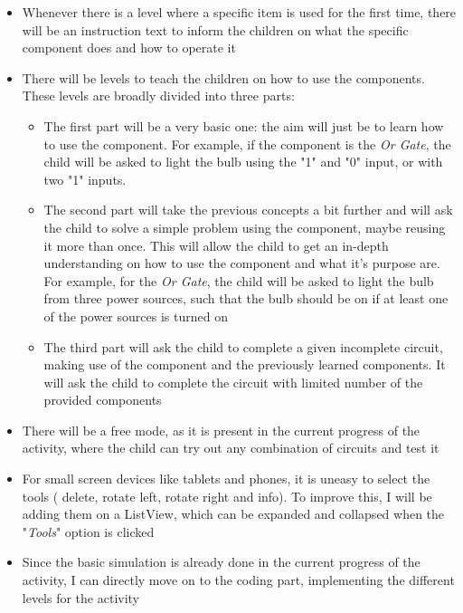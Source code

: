 \documentclass[preprint,12pt]{elsarticle}
\begin{document}
\begin{itemize}
\item Whenever there is a level where a specific item is used for the first time, there will be an instruction text to inform the children on what the specific component does and how to operate it
\item There will be levels to teach the children on how to use the components. These levels are broadly divided into three parts:
\begin{itemize}
\item The first part will be a very basic one: the aim will just be to learn how to use the component. For example, if the component is the \textit{Or Gate}, the child will be asked to light the bulb using the "1" and "0" input, or with two "1" inputs.
\item The second part will take the previous concepts a bit further and will ask the child to solve a simple problem using the component, maybe reusing it more than once. This will allow the child to get an in-depth understanding on how to use the component and what it’s purpose are. For example, for the \textit{Or Gate}, the child will be asked to light the bulb from three power sources, such that the bulb should be on if at least one of the power sources is turned on
\item The third part will ask the child to complete a given incomplete circuit, making use of the component and the previously learned components. It will ask the child to complete the circuit with limited number of the provided components
\end{itemize}
\item There will be a free mode, as it is present in the current progress of the activity, where the child can try out any combination of circuits and test it
\item For small screen devices like tablets and phones, it is uneasy to select the tools ( delete, rotate left, rotate right and info). To improve this, I will be adding them on a ListView, which can be expanded and collapsed when the "\textit{Tools}" option is clicked
\item Since the basic simulation is already done in the current progress of the activity, I can directly move on to the coding part, implementing the different levels for the activity
\end{itemize}
\end{document}

